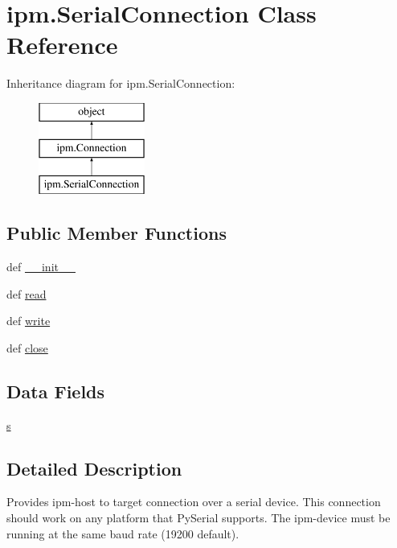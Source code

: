 \hypertarget{classipm_1_1_serial_connection}{\section{ipm.\-Serial\-Connection Class Reference}
\label{classipm_1_1_serial_connection}
}
Inheritance diagram for ipm.\-Serial\-Connection\-:\begin{figure}[H]
\begin{center}
\leavevmode
\includegraphics[height=3.000000cm]{classipm_1_1_serial_connection}
\end{center}
\end{figure}
\subsection*{Public Member Functions}
\begin{DoxyCompactItemize}
\item 
def \hyperlink{classipm_1_1_serial_connection_a126b64e188a00185a849f0c15598fe11}{\-\_\-\-\_\-init\-\_\-\-\_\-}
\item 
def \hyperlink{classipm_1_1_serial_connection_a274c1d0d3a55ced41a9cc3572cb154eb}{read}
\item 
def \hyperlink{classipm_1_1_serial_connection_a5ab52fc96c89d45d28e45f323335c6fd}{write}
\item 
def \hyperlink{classipm_1_1_serial_connection_a36c03b7dab19b52b9e54be3ae7401f78}{close}
\end{DoxyCompactItemize}
\subsection*{Data Fields}
\begin{DoxyCompactItemize}
\item 
\hyperlink{classipm_1_1_serial_connection_af21d02e89e92c9c86812d1ad9ac27e6b}{s}
\end{DoxyCompactItemize}


\subsection{Detailed Description}
\begin{DoxyVerb}Provides ipm-host to target connection over a serial device.
This connection should work on any platform that PySerial supports.
The ipm-device must be running at the same baud rate (19200 default).
\end{DoxyVerb}
 

